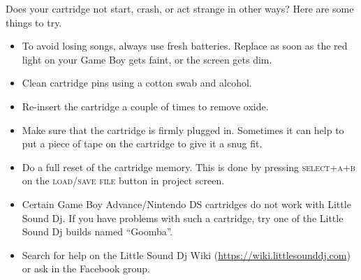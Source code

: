 Does your cartridge not start, crash, or act strange in other ways? Here are some things to try.

\begin{itemize}
	\item To avoid losing songs, always use fresh batteries. Replace as soon as the red light on your Game Boy gets faint, or the screen gets dim.
	\item Clean cartridge pins using a cotton swab and alcohol.
	\item Re-insert the cartridge a couple of times to remove oxide.
	\item Make sure that the cartridge is firmly plugged in. Sometimes it can help to put a piece of tape on the cartridge to give it a snug fit.
	\item Do a full reset of the cartridge memory. This is done by pressing \textsc{select+a+b} on the \textsc{load/save file} button in project screen.
	\item Certain Game Boy Advance/Nintendo DS cartridges do not work with Little Sound Dj. If you have problems with such a cartridge, try one of the Little Sound Dj builds named ``Goomba''.
	\item Search for help on the Little Sound Dj Wiki (\url{https://wiki.littlesounddj.com}) or ask in the Facebook group.
\end{itemize}
